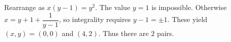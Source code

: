 Rearrange as $ x(y-1)=y^2 $. The value $ y=1 $ is impossible. Otherwise $ x=y+1+\dfrac{1}{y-1}$, so integrality requires $ y-1=\pm1 $. These yield $(x,y)=(0,0)$ and $(4,2)$. Thus there are $\boxed{2}$ pairs.
